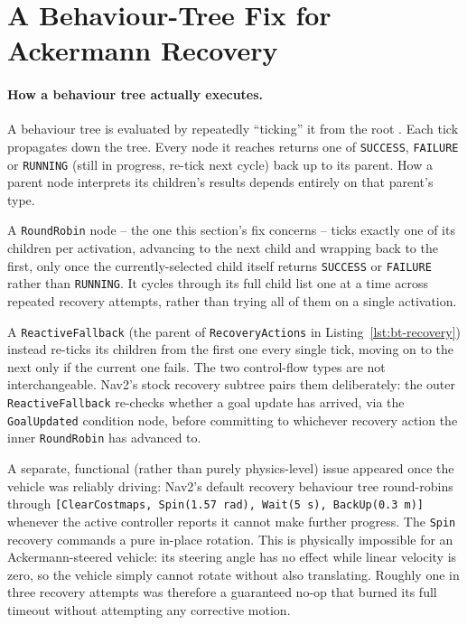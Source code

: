 \section{A Behaviour-Tree Fix for Ackermann Recovery}
\label{sec:bt-fix}

\paragraph{How a behaviour tree actually executes.}
A behaviour tree is evaluated by repeatedly ``ticking'' it from the
root \cite{colledanchise2018bt}. Each tick propagates down the tree.
Every node it reaches returns one of \texttt{SUCCESS},
\texttt{FAILURE} or \texttt{RUNNING} (still in progress, re-tick
next cycle) back up to its parent. How a parent node interprets its
children's results depends entirely on that parent's type.

A \texttt{RoundRobin} node -- the one this section's fix concerns --
ticks exactly one of its children per activation, advancing to the
next child and wrapping back to the first, only once the
currently-selected child itself returns \texttt{SUCCESS} or
\texttt{FAILURE} rather than \texttt{RUNNING}. It cycles through its
full child list one at a time across repeated recovery attempts,
rather than trying all of them on a single activation.

A \texttt{ReactiveFallback} (the parent of \texttt{RecoveryActions}
in Listing~\ref{lst:bt-recovery}) instead re-ticks its children from
the first one every single tick, moving on to the next only if the
current one fails. The two control-flow types are not
interchangeable. Nav2's stock recovery subtree pairs them
deliberately: the outer \texttt{ReactiveFallback} re-checks whether a
goal update has arrived, via the \texttt{GoalUpdated} condition node,
before committing to whichever recovery action the inner
\texttt{RoundRobin} has advanced to.

A separate, functional (rather than purely physics-level) issue
appeared once the vehicle was reliably driving: Nav2's default
recovery behaviour tree \cite{macenski2020nav2} round-robins through
\texttt{[ClearCostmaps, Spin(1.57\,rad), Wait(5\,s), BackUp(0.3\,m)]}
whenever the active controller reports it cannot make further
progress. The \texttt{Spin} recovery commands a pure in-place
rotation. This is physically impossible for an Ackermann-steered
vehicle: its steering angle has no effect while linear velocity is
zero, so the vehicle simply cannot rotate without also translating.
Roughly
one in three recovery attempts was therefore a guaranteed no-op that
burned its full timeout without attempting any corrective motion.

